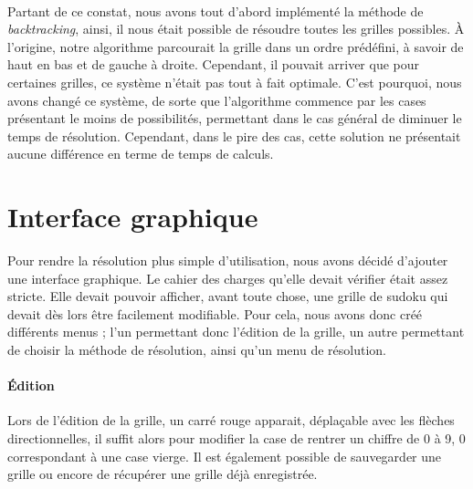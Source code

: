 \documentclass[12pt,a4paper]{report}
\begin{document}
\paragraph{} Partant de ce constat, nous avons tout d'abord implémenté la méthode de \emph{backtracking}, ainsi, il nous était possible de résoudre toutes les grilles possibles. \`{A} l'origine, notre algorithme parcourait la grille dans un ordre prédéfini, à savoir de haut en bas et de gauche à droite. Cependant, il pouvait arriver que pour certaines grilles, ce système n'était pas tout à fait optimale. C'est pourquoi, nous avons changé ce système, de sorte que l'algorithme commence par les cases présentant le moins de possibilités, permettant dans le cas général de diminuer le temps de résolution. Cependant, dans le pire des cas, cette solution ne présentait aucune différence en terme de temps de calculs.


\newpage
\section{Interface graphique}
Pour rendre la résolution plus simple d'utilisation, nous avons décidé d'ajouter une interface graphique. Le cahier des charges qu'elle devait vérifier était assez stricte. Elle devait pouvoir afficher, avant toute chose, une grille de sudoku qui devait dès lors être facilement modifiable. Pour cela, nous avons donc créé différents menus ; l'un permettant donc l'édition de la grille, un autre permettant de choisir la méthode de résolution, ainsi qu'un menu de résolution. 

\paragraph{Édition} Lors de l'édition de la grille, un carré rouge apparait, déplaçable avec les flèches directionnelles, il suffit alors pour modifier la case de rentrer un chiffre de 0 à 9, 0 correspondant à une case vierge. Il est également possible de sauvegarder une grille ou encore de récupérer une grille déjà enregistrée.
\end{document}
